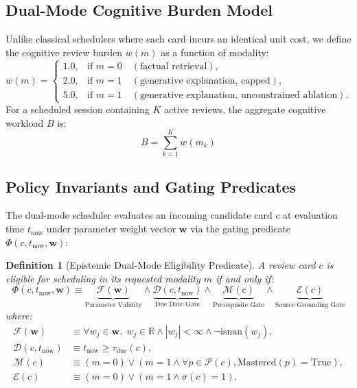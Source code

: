 \documentclass[11pt,a4paper]{article}
\newtheorem{definition}{Definition}
\begin{document}
\subsection{Dual-Mode Cognitive Burden Model}
Unlike classical schedulers where each card incurs an identical unit cost, we define the cognitive review burden $w(m)$ as a function of modality:
\begin{equation}
    w(m) = \begin{cases}
        1.0, & \text{if } m = 0 \quad (\text{factual retrieval}), \\
        2.0, & \text{if } m = 1 \quad (\text{generative explanation, capped}), \\
        5.0, & \text{if } m = 1 \quad (\text{generative explanation, unconstrained ablation}).
    \end{cases}
\end{equation}
For a scheduled session containing $K$ active reviews, the aggregate cognitive workload $B$ is:
\begin{equation}
    B = \sum_{k=1}^K w(m_k)
\end{equation}

\subsection{Policy Invariants and Gating Predicates}
The dual-mode scheduler evaluates an incoming candidate card $c$ at evaluation time $t_{\text{now}}$ under parameter weight vector $\mathbf{w}$ via the gating predicate $\Phi(c, t_{\text{now}}, \mathbf{w})$:
\begin{definition}[Epistemic Dual-Mode Eligibility Predicate]
\label{def:predicate}
A review card $c$ is eligible for scheduling in its requested modality $m$ if and only if:
\begin{equation}
    \label{eq:predicate}
    \Phi(c, t_{\text{now}}, \mathbf{w}) \equiv \underbrace{\mathcal{F}(\mathbf{w})}_{\text{Parameter Validity}} \land \underbrace{\mathcal{D}(c, t_{\text{now}})}_{\text{Due Date Gate}} \land \underbrace{\mathcal{M}(c)}_{\text{Prerequisite Gate}} \land \underbrace{\mathcal{E}(c)}_{\text{Source Grounding Gate}}
\end{equation}
where:
\begin{align}
    \mathcal{F}(\mathbf{w}) &\equiv \forall w_j \in \mathbf{w}, \; w_j \in \mathbb{R} \land |w_j| < \infty \land \neg\text{isnan}(w_j), \\
    \mathcal{D}(c, t_{\text{now}}) &\equiv t_{\text{now}} \ge \tau_{\text{due}}(c), \\
    \mathcal{M}(c) &\equiv (m=0) \lor (m=1 \land \forall p \in \mathcal{P}(c), \text{Mastered}(p) = \text{True}), \\
    \mathcal{E}(c) &\equiv (m=0) \lor (m=1 \land \sigma(c) = 1).
\end{align}
\end{definition}
\end{document}
